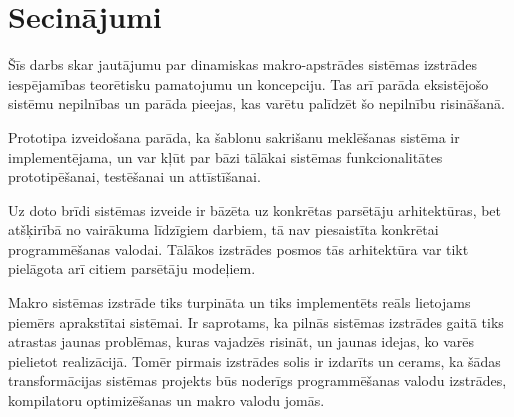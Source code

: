 \documentclass[12pt, a4paper]{article}
\begin{document}
\titullapa



\setcounter{tocdepth}{4}
\tableofcontents















\section*{Secinājumi}
\label{s:conclusions}

Šīs darbs skar jautājumu par dinamiskas makro-apstrādes sistēmas izstrādes iespējamības teorētisku pamatojumu un koncepciju. Tas arī parāda eksistējošo sistēmu nepilnības un parāda pieejas, kas varētu palīdzēt šo nepilnību risināšanā.

Prototipa izveidošana parāda, ka šablonu sakrišanu meklēšanas sistēma ir implementējama, un var kļūt par bāzi tālākai sistēmas funkcionalitātes prototipēšanai, testēšanai un attīstīšanai.

Uz doto brīdi sistēmas izveide ir bāzēta uz konkrētas parsētāju arhitektūras, bet atšķirībā no vairākuma līdzīgiem darbiem, tā nav piesaistīta konkrētai programmēšanas valodai. Tālākos izstrādes posmos tās arhitektūra var tikt pielāgota arī citiem parsētāju modeļiem.

Makro sistēmas izstrāde tiks turpināta un tiks implementēts reāls lietojams piemērs aprakstītai sistēmai. Ir saprotams, ka pilnās sistēmas izstrādes gaitā tiks atrastas jaunas problēmas, kuras vajadzēs risināt, un jaunas idejas, ko varēs pielietot realizācijā. Tomēr pirmais izstrādes solis ir izdarīts un cerams, ka šādas transformācijas sistēmas projekts būs noderīgs programmēšanas valodu izstrādes, kompilatoru optimizēšanas un makro valodu jomās.

\appendixtitleon
\appendixtitletocon
\end{document}
